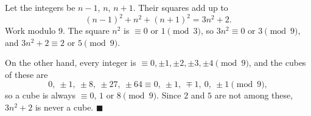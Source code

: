Let the integers be $n-1$, $n$, $n+1$. Their squares add up to
\[
(n-1)^2+n^2+(n+1)^2=3n^2+2 .
\]
Work modulo $9$. The square $n^2$ is $\equiv0$ or $1\pmod3$, so $3n^2\equiv0$ or $3\pmod9$, and $3n^2+2\equiv2$ or $5\pmod9$.

On the other hand, every integer is $\equiv0,\pm1,\pm2,\pm3,\pm4\pmod9$, and the cubes of these are
\[
0,\ \pm1,\ \pm8,\ \pm27,\ \pm64\equiv0,\ \pm1,\ \mp1,\ 0,\ \pm1\pmod9,
\]
so a cube is always $\equiv0$, $1$ or $8\pmod9$. Since $2$ and $5$ are not among these, $3n^2+2$ is never a cube. $\blacksquare$
